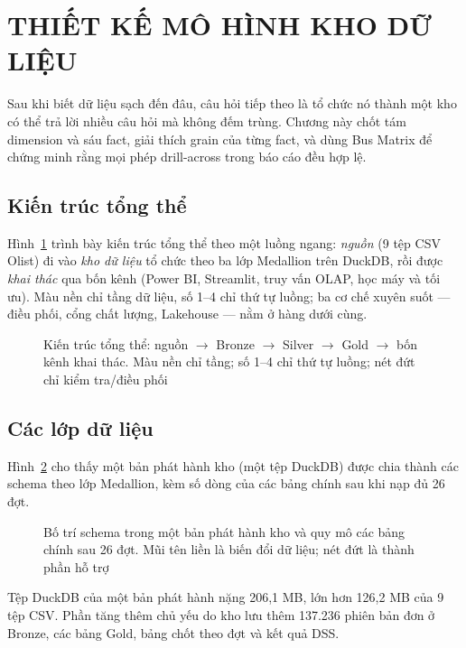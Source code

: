 \section{THIẾT KẾ MÔ HÌNH KHO DỮ LIỆU}
\suppressfloats[t]

Sau khi biết dữ liệu sạch đến đâu, câu hỏi tiếp theo là tổ chức nó thành một kho có thể trả lời nhiều câu hỏi mà không đếm trùng. Chương này chốt tám dimension và sáu fact, giải thích grain của từng fact, và dùng Bus Matrix để chứng minh rằng mọi phép drill-across trong báo cáo đều hợp lệ.

\subsection{Kiến trúc tổng thể}
Hình~\ref{fig:arch_overview} trình bày kiến trúc tổng thể theo một luồng ngang: \emph{nguồn} (9 tệp CSV Olist) đi vào \emph{kho dữ liệu} tổ chức theo ba lớp Medallion trên DuckDB, rồi được \emph{khai thác} qua bốn kênh (Power BI, Streamlit, truy vấn OLAP, học máy và tối ưu). Màu nền chỉ tầng dữ liệu, số 1--4 chỉ thứ tự luồng; ba cơ chế xuyên suốt — điều phối, cổng chất lượng, Lakehouse — nằm ở hàng dưới cùng.

\begin{figure}[tbp]
\centering
\resizebox{\textwidth}{!}{}
\caption{Kiến trúc tổng thể: nguồn $\rightarrow$ Bronze $\rightarrow$ Silver $\rightarrow$ Gold $\rightarrow$ bốn kênh khai thác. Màu nền chỉ tầng; số 1--4 chỉ thứ tự luồng; nét đứt chỉ kiểm tra/điều phối}
\label{fig:arch_overview}
\end{figure}



\subsection{Các lớp dữ liệu}
Hình~\ref{fig:arch} cho thấy một bản phát hành kho (một tệp DuckDB) được chia thành các schema theo lớp Medallion, kèm số dòng của các bảng chính sau khi nạp đủ 26 đợt.

\begin{figure}[htbp]
\centering
\resizebox{\textwidth}{!}{}
\caption{Bố trí schema trong một bản phát hành kho và quy mô các bảng chính sau 26 đợt. Mũi tên liền là biến đổi dữ liệu; nét đứt là thành phần hỗ trợ}
\label{fig:arch}
\end{figure}



Tệp DuckDB của một bản phát hành nặng 206,1 MB, lớn hơn 126,2 MB của 9 tệp CSV. Phần tăng thêm chủ yếu do kho lưu thêm 137.236 phiên bản đơn ở Bronze, các bảng Gold, bảng chốt theo đợt và kết quả DSS.

